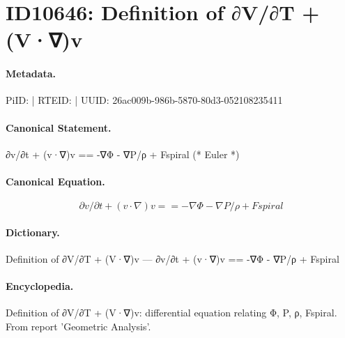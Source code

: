 \section*{ID10646: Definition of ∂V/∂T + (V·∇)v}
\paragraph{Metadata.}
PiID:  | RTEID:  | UUID: 26ac009b-986b-5870-80d3-052108235411

\paragraph{Canonical Statement.}
∂v/∂t + (v·∇)v == -∇Φ - ∇P/ρ + Fspiral (* Euler *)

\paragraph{Canonical Equation.}
\[
∂v/∂t + (v·∇)v == -∇Φ - ∇P/ρ + Fspiral
\]

\paragraph{Dictionary.}
Definition of ∂V/∂T + (V·∇)v — ∂v/∂t + (v·∇)v == -∇Φ - ∇P/ρ + Fspiral

\paragraph{Encyclopedia.}
Definition of ∂V/∂T + (V·∇)v: differential equation relating Φ, P, ρ, Fspiral. From report 'Geometric Analysis'.
